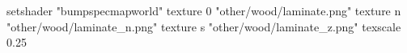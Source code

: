 setshader "bumpspecmapworld"
   texture 0 "other/wood/laminate.png"
   texture n "other/wood/laminate_n.png"
   texture s "other/wood/laminate_z.png"
texscale 0.25